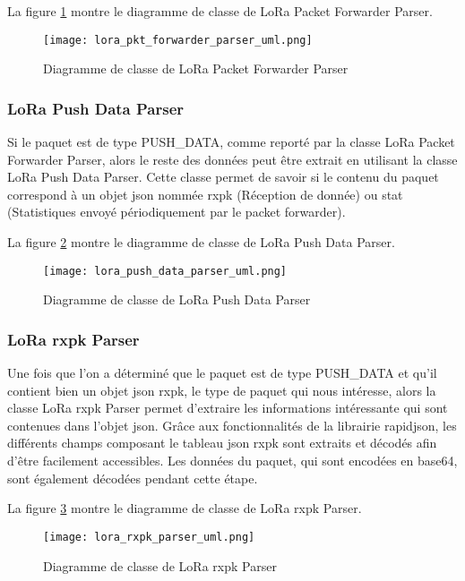 La figure \ref{fig:lora_pkt_forwarder_parser_uml} montre le diagramme de classe de LoRa Packet Forwarder Parser.

\begin{figure}[htb]
\centering 
\texttt{[image: lora\_pkt\_forwarder\_parser\_uml.png]} 
\caption{Diagramme de classe de LoRa Packet Forwarder Parser}
\label{fig:lora_pkt_forwarder_parser_uml}
 \end{figure}

\subsubsection{LoRa Push Data Parser}

Si le paquet est de type PUSH\_DATA, comme reporté par la classe LoRa Packet Forwarder Parser, alors le reste des données peut être extrait en utilisant la classe LoRa Push Data Parser. Cette classe permet de savoir si le contenu du paquet correspond à un objet json nommée rxpk (Réception de donnée) ou stat (Statistiques envoyé périodiquement par le packet forwarder).

La figure \ref{fig:lora_push_data_parser_uml} montre le diagramme de classe de LoRa Push Data Parser.

\begin{figure}[htb]
\centering 
\texttt{[image: lora\_push\_data\_parser\_uml.png]} 
\caption{Diagramme de classe de LoRa Push Data Parser}
\label{fig:lora_push_data_parser_uml}
 \end{figure}

\subsubsection{LoRa rxpk Parser}

Une fois que l'on a déterminé que le paquet est de type PUSH\_DATA et qu'il contient bien un objet json rxpk, le type de paquet qui nous intéresse, alors la classe LoRa rxpk Parser permet d'extraire les informations intéressante qui sont contenues dans l'objet json. Grâce aux fonctionnalités de la librairie rapidjson, les différents champs composant le tableau json rxpk sont extraits et décodés afin d'être facilement accessibles. Les données du paquet, qui sont encodées en base64, sont également décodées pendant cette étape.

La figure \ref{fig:lora_rxpk_parser_uml} montre le diagramme de classe de LoRa rxpk Parser.

\begin{figure}[htb]
\centering 
\texttt{[image: lora\_rxpk\_parser\_uml.png]} 
\caption{Diagramme de classe de LoRa rxpk Parser}
\label{fig:lora_rxpk_parser_uml}
 \end{figure}


